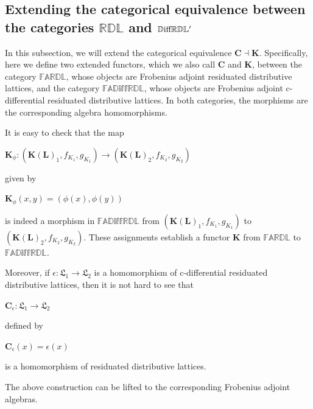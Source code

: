 \documentclass[final,12pt,times]{elsarticle}
\theoremstyle{plain}
\theoremstyle{definition}
\theoremstyle{break}
\begin{document}
\subsection{Extending the categorical equivalence between the categories $\mathbb{RDL}$ and $\mathbb{D\textmd{iff}RDL'}$ }\label{subsection:CAE-FARL}

In this subsection, we will extend the categorical equivalence $\mathbf{C} \dashv \mathbf{K}$. Specifically, here we define two extended functors, which we also call $\mathbf{C}$ and $\mathbf{K}$, between the category $\mathbb{FARDL}$, whose objects are Frobenius adjoint residuated distributive lattices, and the category $\mathbb{FAD\text{iff}RDL}$, whose objects are Frobenius adjoint c-differential residuated distributive lattices. In both categories, the morphisms are the corresponding algebra homomorphisms.


It is easy to check that the map
\begin{center}
$\mathbf{K}_{\phi}:(\mathbf{K(L)}_1,f_{K_1},g_{K_1})\rightarrow (\mathbf{K(L)}_2,f_{K_2},g_{K_2})$
 \end{center} given by
 \begin{center} $\mathbf{K}_{\phi}(x,y)=(\phi(x),\phi(y))$
 \end{center} is indeed a morphism in $\mathbb{FAD\text{iff}RDL}$ from $(\mathbf{K(L)}_1,f_{K_1},g_{K_1})$ to $(\mathbf{K(L)}_2,f_{K_2},g_{K_2})$. These assignments establish a functor $\mathbf{K}$ from $\mathbb{FARDL}$ to $\mathbb{FAD\text{iff}RDL}$.

Moreover, if $\epsilon:\boldsymbol{\mathfrak{L}}_1\rightarrow \boldsymbol{\mathfrak{L}}_2$ is a homomorphism of c-differential residuated distributive lattices, then it is not hard to see that
\begin{center}$\mathbf{C}_{\epsilon}:\boldsymbol{\mathfrak{L}}_1\rightarrow \boldsymbol{\mathfrak{L}}_2$
\end{center} defined by
\begin{center} $\mathbf{C}_\epsilon(x)=\epsilon(x)$
\end{center} is a homomorphism of residuated distributive lattices.

The above construction can be lifted to the corresponding Frobenius adjoint algebras.
\end{document}
